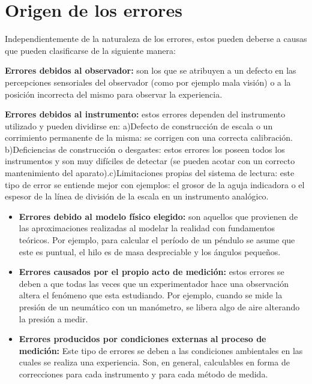  \section{Origen de los errores}
 
Independientemente  de  la  naturaleza  de  los  errores,  estos  pueden  deberse  a  causas  que pueden clasificarse de la 
siguiente manera:

\textbf{Errores  debidos  al  observador:} son los que se atribuyen a un defecto en las percepciones sensoriales del observador 
(como por ejemplo mala visión) o a la posición incorrecta del mismo para observar la experiencia.

\textbf{Errores  debidos  al  instrumento:} estos errores  dependen  del  instrumento  utilizado  y  pueden dividirse 
en: a)Defecto  de  construcción  de  escala  o  un  corrimiento  permanente  de  la  misma: se corrigen con una correcta 
calibración. b)Deficiencias   de   construcción o desgastes:  estos   errores   los   poseen   todos   los instrumentos  y  
son  muy  difíciles  de  detectar  (se  pueden  acotar  con  un  correcto mantenimiento del aparato).c)Limitaciones  propias  del  
sistema  de  lectura:  este  tipo  de  error  se  entiende  mejor  con ejemplos:  el  grosor  de  la  aguja  indicadora  o  el  
espesor  de  la  línea  de  división  de  la escala en un instrumento analógico.

\begin{itemize}
 \item \textbf{Errores  debido  al  modelo  físico  elegido:} son  aquellos  que  provienen  de  las  aproximaciones realizadas  
al modelar la realidad con fundamentos teóricos. Por  ejemplo,  para  calcular  el período  de  un  péndulo  se  asume  que  
este  es  puntual,  el  hilo  es  de  masa  despreciable  y  los ángulos pequeños.

\item \textbf{Errores causados por el propio acto de medición:} estos errores se deben a que todas las veces que  un  
experimentador hace  una  observación  altera  el  fenómeno  que  esta  estudiando. Por ejemplo, cuando se mide la presión de un 
neumático con un manómetro, se libera algo de aire alterando la presión a medir.  

\item \textbf{Errores producidos  por  condiciones  externas  al  proceso  de  medición:}  Este  tipo  de  errores  se deben a 
las condiciones ambientales en las cuales se realiza una experiencia.  Son, en general, calculables en forma de correcciones para 
cada instrumento y para cada método de medida.  

\end{itemize}

